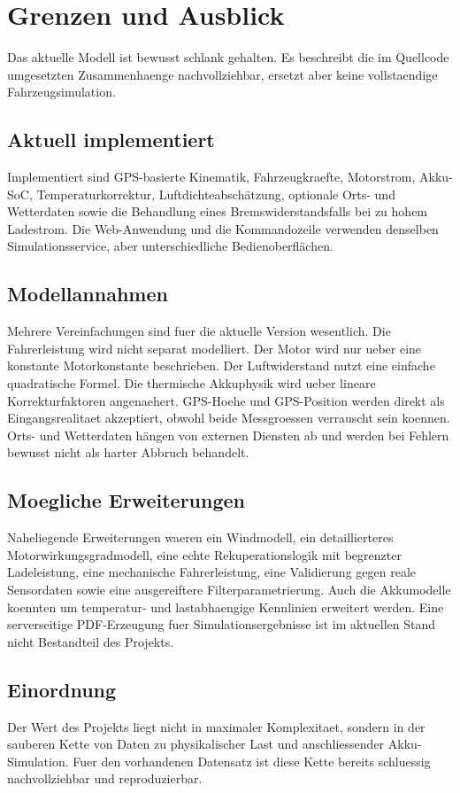 \chapter{Grenzen und Ausblick}
\label{ch:grenzen}

Das aktuelle Modell ist bewusst schlank gehalten. Es beschreibt die im Quellcode umgesetzten Zusammenhaenge nachvollziehbar, ersetzt aber keine vollstaendige Fahrzeugsimulation.

\section{Aktuell implementiert}

Implementiert sind GPS-basierte Kinematik, Fahrzeugkraefte, Motorstrom, Akku-SoC, Temperaturkorrektur, Luftdichteabschätzung, optionale Orts- und Wetterdaten sowie die Behandlung eines Bremswiderstandsfalls bei zu hohem Ladestrom. Die Web-Anwendung und die Kommandozeile verwenden denselben Simulationsservice, aber unterschiedliche Bedienoberflächen.

\section{Modellannahmen}

Mehrere Vereinfachungen sind fuer die aktuelle Version wesentlich. Die Fahrerleistung wird nicht separat modelliert. Der Motor wird nur ueber eine konstante Motorkonstante beschrieben. Der Luftwiderstand nutzt eine einfache quadratische Formel. Die thermische Akkuphysik wird ueber lineare Korrekturfaktoren angenaehert. GPS-Hoehe und GPS-Position werden direkt als Eingangsrealitaet akzeptiert, obwohl beide Messgroessen verrauscht sein koennen. Orts- und Wetterdaten hängen von externen Diensten ab und werden bei Fehlern bewusst nicht als harter Abbruch behandelt.

\section{Moegliche Erweiterungen}

Naheliegende Erweiterungen waeren ein Windmodell, ein detaillierteres Motorwirkungsgradmodell, eine echte Rekuperationslogik mit begrenzter Ladeleistung, eine mechanische Fahrerleistung, eine Validierung gegen reale Sensordaten sowie eine ausgereiftere Filterparametrierung. Auch die Akkumodelle koennten um temperatur- und lastabhaengige Kennlinien erweitert werden. Eine serverseitige PDF-Erzeugung fuer Simulationsergebnisse ist im aktuellen Stand nicht Bestandteil des Projekts.

\section{Einordnung}

Der Wert des Projekts liegt nicht in maximaler Komplexitaet, sondern in der sauberen Kette von Daten zu physikalischer Last und anschliessender Akku-Simulation. Fuer den vorhandenen Datensatz ist diese Kette bereits schluessig nachvollziehbar und reproduzierbar.